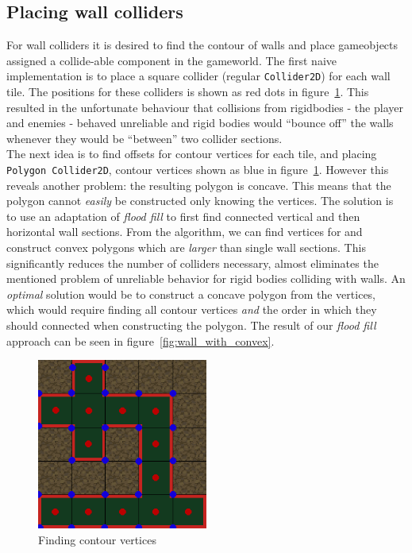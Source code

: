 \subsection{Placing wall colliders}
For wall colliders it is desired to find the contour of walls and place
gameobjects assigned a collide-able component in the gameworld. The first naive
implementation is to place a square collider (regular \texttt{Collider2D}) for
each wall tile.  The positions for these colliders is shown as red dots in
figure~\ref{fig:wall_with_vertices}.  This resulted in the unfortunate
behaviour that collisions from rigidbodies - the player and enemies - behaved
unreliable and rigid bodies would ``bounce off'' the walls whenever they would
be ``between'' two collider sections.
\\
The next idea is to find offsets for contour vertices for each tile, and
placing \texttt{Polygon Collider2D}, contour vertices shown as blue in
figure~\ref{fig:wall_with_vertices}. However this reveals another problem: the
resulting polygon is concave. This means that the polygon cannot
\textit{easily} be constructed only knowing the vertices. The solution is to
use an adaptation of \textit{flood fill} to first find connected vertical and
then horizontal wall sections. From the algorithm, we can find vertices for and
construct convex polygons which are \textit{larger} than single wall sections.
This significantly reduces the number of colliders necessary, almost eliminates
the mentioned problem of unreliable behavior for rigid bodies colliding with
walls. An \textit{optimal} solution would be to construct a concave polygon
from the vertices, which would require finding all contour vertices
\textit{and} the order in which they should connected when constructing the
polygon. The result of our \textit{flood fill} approach can be seen in
figure~\ref{fig:wall_with_convex}.

\begin{figure}[H]
    \centering
    \includegraphics[width=0.5\textwidth]{figures/generating_levels/wall_with_vertices.png}
    \caption{Finding contour vertices}\label{fig:wall_with_vertices} 
\end{figure}

